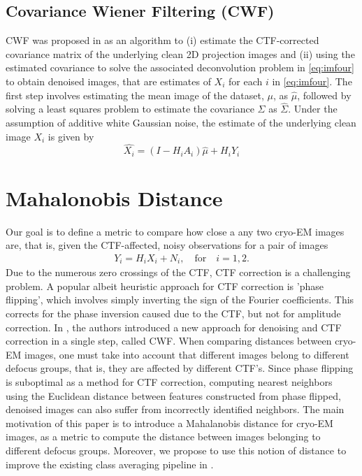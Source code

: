 \documentclass{article}
\begin{document}
\subsection{Covariance Wiener Filtering (CWF)}
CWF was proposed in \cite{cwf} as an algorithm to (i) estimate the CTF-corrected covariance matrix of the underlying clean 2D projection images and (ii) using the estimated covariance to solve the associated deconvolution problem in \ref{eq:imfour} to obtain denoised images, that are estimates of $X_i$ for each $i$ in 
\ref{eq:imfour}. The first step involves estimating the mean image of the dataset, $\mu$, as $\hat{\mu}$, followed by solving a least squares problem to estimate the covariance $\Sigma$ as $\hat{\Sigma}$. Under the assumption of additive white Gaussian noise, the estimate of the underlying clean image $X_i$ is given by
\begin{equation}
\hat{X_i}=(I-H_iA_i)\hat{\mu} + H_iY_i
\end{equation}
%
\section{Mahalonobis Distance}
Our goal is to define a metric to compare how close a any two cryo-EM images are, that is, given the CTF-affected, noisy observations for a pair of images
\begin{eqnarray} 
Y_i=H_i X_i + N_i, \quad \text{for} \quad i=1,2 .
\end{eqnarray}
Due to the numerous zero crossings of the CTF, CTF correction is a challenging problem. A popular albeit heuristic approach for CTF correction is 'phase flipping', which involves simply inverting the sign of the Fourier coefficients. This corrects for the phase inversion caused due to the CTF, but not for amplitude correction. In \cite{cwf}, the authors introduced a new approach for denoising and CTF correction in a single step, called CWF. When comparing distances between cryo-EM images, one must take into account that different images belong to different defocus groups, that is, they are affected by different CTF's. Since phase flipping is suboptimal as a method for CTF correction, computing nearest neighbors using the Euclidean distance between features constructed from phase flipped, denoised images can also suffer from incorrectly identified neighbors. The main motivation of this paper is to introduce a Mahalanobis distance for cryo-EM images, as a metric to compute the distance between images belonging to different defocus groups. Moreover, we propose to use this notion of distance to improve the existing class averaging pipeline in \cite{zhao1}.
\end{document}

